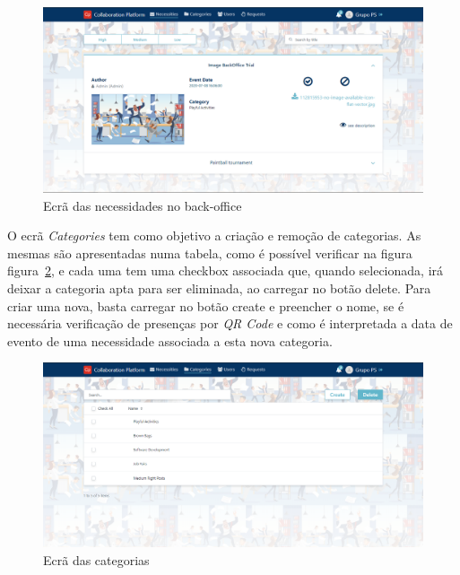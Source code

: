 \begin{figure}[H]
  \centering 
  \includegraphics[scale=0.35]{figures/backoffice_necessities.png}
  \caption{Ecrã das necessidades no back-office}\label{fig:backoffice_necessities}
\end{figure}



O ecrã \textit{Categories} tem como objetivo a criação e remoção de categorias. 
As mesmas são apresentadas numa tabela, como é possível verificar na figura figura~\ref{fig:backoffice_categories}, e cada uma tem uma checkbox associada que, quando selecionada, irá deixar a categoria apta para ser eliminada, ao carregar no botão delete. 
Para criar uma nova, basta carregar no botão create e preencher o nome, se é necessária verificação de presenças por \textit{QR Code} e como é interpretada a data de evento de uma necessidade associada a esta nova categoria.

\begin{figure}[H]
  \centering 
  \includegraphics[scale=0.35]{figures/backoffice_categories.png}
  \caption{Ecrã das categorias}\label{fig:backoffice_categories}
\end{figure}

\newpage

